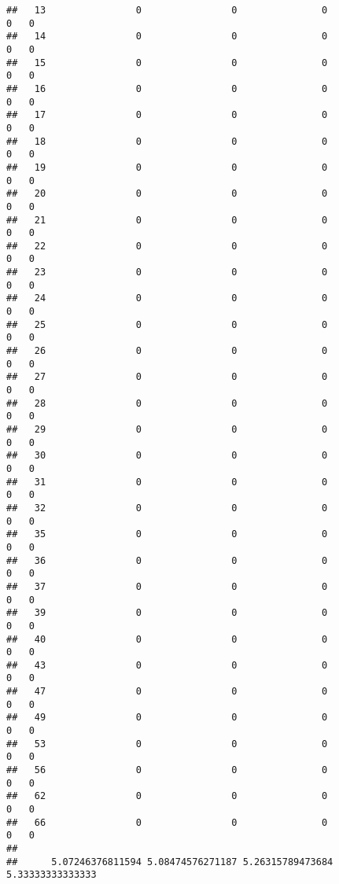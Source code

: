 \documentclass[]{article}
\begin{document}
\begin{verbatim}
##   13                0                0               0                0   0
##   14                0                0               0                0   0
##   15                0                0               0                0   0
##   16                0                0               0                0   0
##   17                0                0               0                0   0
##   18                0                0               0                0   0
##   19                0                0               0                0   0
##   20                0                0               0                0   0
##   21                0                0               0                0   0
##   22                0                0               0                0   0
##   23                0                0               0                0   0
##   24                0                0               0                0   0
##   25                0                0               0                0   0
##   26                0                0               0                0   0
##   27                0                0               0                0   0
##   28                0                0               0                0   0
##   29                0                0               0                0   0
##   30                0                0               0                0   0
##   31                0                0               0                0   0
##   32                0                0               0                0   0
##   35                0                0               0                0   0
##   36                0                0               0                0   0
##   37                0                0               0                0   0
##   39                0                0               0                0   0
##   40                0                0               0                0   0
##   43                0                0               0                0   0
##   47                0                0               0                0   0
##   49                0                0               0                0   0
##   53                0                0               0                0   0
##   56                0                0               0                0   0
##   62                0                0               0                0   0
##   66                0                0               0                0   0
##     
##      5.07246376811594 5.08474576271187 5.26315789473684 5.33333333333333

\end{verbatim}
\end{document}
